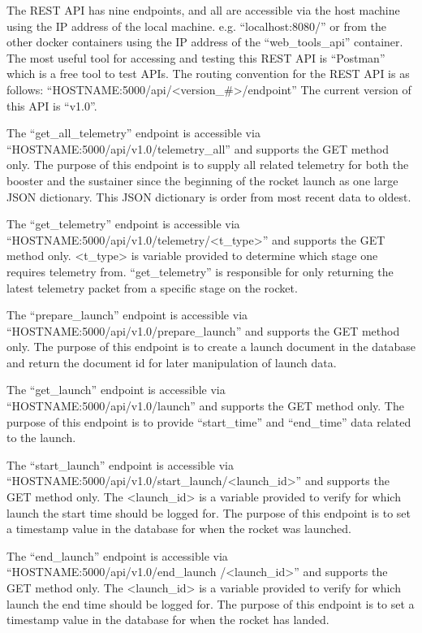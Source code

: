 \documentclass[onecolumn, draftclsnofoot,10pt, compsoc]{IEEEtran}
\begin{document}
The REST API has nine endpoints, and all are accessible via the host machine using the IP address of the local machine. e.g. “localhost:8080/” or from the other docker containers using the IP address of the “web\_tools\_api” container. The most useful tool for accessing and testing this REST API is “Postman” which is a free tool to test APIs. The routing convention for the REST API is as follows: ``HOSTNAME:5000/api/<version\_\#>/endpoint'' The current version of this API is “v1.0”. \par

The “get\_all\_telemetry” endpoint is accessible via “HOSTNAME:5000/api/v1.0/telemetry\_all” and supports the GET method only. The purpose of this endpoint is to supply all related telemetry for both the booster and the sustainer since the beginning of the rocket launch as one large JSON dictionary. This JSON dictionary is order from most recent data to oldest. \par

 The “get\_telemetry” endpoint is accessible via “HOSTNAME:5000/api/v1.0/telemetry/<t\_type>” and supports the GET method only. <t\_type> is variable provided to determine which stage one requires telemetry from. “get\_telemetry” is responsible for only returning the latest telemetry packet from a specific stage on the rocket. \par

The “prepare\_launch” endpoint is accessible via “HOSTNAME:5000/api/v1.0/prepare\_launch” and supports the GET method only. The purpose of this endpoint is to create a launch document in the database and return the document id for later manipulation of launch data.\par

The “get\_launch” endpoint is accessible via “HOSTNAME:5000/api/v1.0/launch” and supports the GET method only. The purpose of this endpoint is to provide “start\_time” and “end\_time” data related to the launch. \par

The “start\_launch” endpoint is accessible via “HOSTNAME:5000/api/v1.0/start\_launch/<launch\_id>” and supports the GET method only. The <launch\_id> is a variable provided to verify for which launch the start time should be logged for. The purpose of this endpoint is to set a timestamp value in the database for when the rocket was launched. \par

The “end\_launch” endpoint is accessible via “HOSTNAME:5000/api/v1.0/end\_launch /<launch\_id>” and supports the GET method only. The <launch\_id> is a variable provided to verify for which launch the end time should be logged for. The purpose of this endpoint is to set a timestamp value in the database for when the rocket has landed. \par
\end{document}
